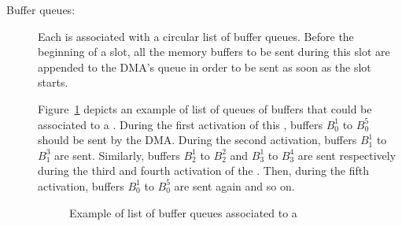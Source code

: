 \documentclass[main.tex]{subfiles}
\begin{document}
\begin{description}
    \item[Buffer queues: ] Each \PC{} is associated with a circular list of
        buffer queues. Before the beginning of a \PC{} slot, all the memory
        buffers to be sent during this slot are appended to the DMA's queue in
        order to be sent as soon as the \PC{} slot starts.
        \begin{example}
            Figure~\ref{fig_implemExecModel_exBufferQueues} depicts an example
            of list of queues of buffers that could be associated to a \PC{}.
            During the first activation of this \PC{}, buffers $B_0^1$ to
            $B_0^5$ should be sent by the DMA. During the second activation,
            buffers $B_1^1$ to $B_1^3$ are sent. Similarly, buffers $B_2^1$ to
            $B_2^2$ and $B_3^1$ to $B_3^4$ are sent respectively during the
            third and fourth activation of the \PC{}. Then, during the fifth
            activation, buffers $B_0^1$ to $B_0^5$ are sent again and so on.
            \begin{figure}
                \centering
                \scalebox{0.75}{}
                \caption{Example of list of buffer queues associated to a \PC{}}
                \label{fig_implemExecModel_exBufferQueues}
            \end{figure}
        \end{example}


\end{description}
\end{document}
